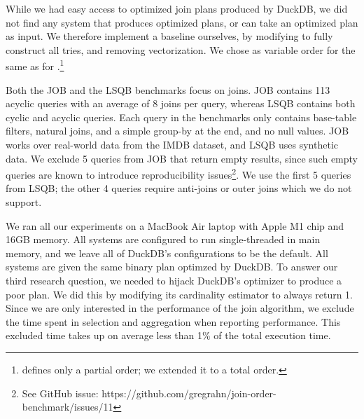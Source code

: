 While we had easy access to optimized join plans produced by DuckDB,
we did not find any system that produces optimized \GJ plans,
or can take an optimized plan as input.
We therefore implement a \GJ baseline ourselves,
by modifying \FJ to fully construct all tries, and removing
vectorization.  We chose as variable order for \GJ the same as for
\FJ.\footnote{\FJ defines only a partial order; we extended it to a
  total order.}


Both  the JOB and the LSQB benchmarks  focus on joins.
JOB contains 113 acyclic queries with an average of 8 joins per query,
whereas LSQB contains both cyclic and acyclic queries.
Each query in the benchmarks only contains base-table filters,
natural joins, and a simple group-by at the end,
and no null values.
JOB works over real-world data from the IMDB dataset,
and LSQB uses synthetic data.
We exclude 5 queries from JOB that return empty results,
since such empty queries are known to introduce reproducibility issues\footnote{
  See GitHub issue: https://github.com/gregrahn/join-order-benchmark/issues/11
}.
We use the first 5 queries from LSQB; the other 4 queries require
anti-joins or outer joins which we do not support.

We ran all our experiments on a MacBook Air laptop with Apple M1 chip and 16GB memory.
All systems are configured to run single-threaded in main memory,
and we leave all of DuckDB's configurations to be the default.
All systems are given the same binary plan optimzed by DuckDB.
To answer our third research question,
we needed to hijack DuckDB's optimizer to produce a poor plan.
We did this by modifying its cardinality estimator to always return 1.
Since we are only interested in the performance of the join algorithm,
we exclude the time spent in selection and aggregation
when reporting performance.
This excluded time takes up on average less than 1\% of the total execution time.

